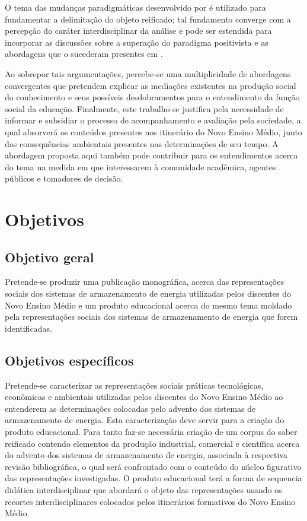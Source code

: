 \documentclass[
   article,       %
   12pt,          %
   oneside,       %
   a4paper,       %
   english,       %
   brazil,           %
   sumario=tradicional
   ]{abntex2}
\begin{document}
O tema das mudanças paradigmáticas desenvolvido por \cite{Kuhn2012-oa} é utilizado para fundamentar a delimitação do objeto reificado; tal fundamento converge com a percepção do caráter interdisciplinar da análise e pode ser estendida para incorporar as discussões sobre a superação do paradigma positivista e as abordagens que o sucederam presentes em \cite{Lincoln1985-ua}.

Ao sobrepor tais argumentações, percebe-se uma multiplicidade de abordagens convergentes que pretendem explicar as mediações existentes na produção social do conhecimento e seus possíveis desdobramentos para o entendimento da função social da educação.
Finalmente, este trabalho se justifica pela necessidade de informar e subsidiar o processo de acompanhamento e avaliação pela sociedade, a qual absorverá os conteúdos presentes nos itinerário do Novo Ensino Médio, junto das consequências ambientais presentes nas determinações de seu tempo. A abordagem proposta aqui também pode contribuir para os entendimentos acerca do tema na medida em que interessarem à comunidade acadêmica, agentes públicos e tomadores de decisão.


\section{Objetivos}
\subsection{Objetivo geral}

Pretende-se produzir uma publicação monográfica, acerca das representações sociais dos sistemas de armazenamento de energia utilizadas pelos discentes do Novo Ensino Médio e um produto educacional acerca do mesmo tema moldado pela representações sociais dos sistemas de armazenamento de energia que forem identificadas.

\subsection{Objetivos específicos}

Pretende-se caracterizar as  representações sociais práticas tecnológicas, econômicas e ambientais utilizadas pelos discentes do Novo Ensino Médio ao entenderem as determinações colocadas pelo advento dos sistemas de armazenamento de energia. Esta caracterização deve servir para a criação do produto educacional.
Para tanto faz-se necessária criação de um corpus do saber reificado contendo elementos da produção industrial, comercial e científica acerca do advento dos sistemas de armazenamento de energia, associada à respectiva revisão bibliográfica, o qual será confrontado com o conteúdo do núcleo figurativo das representações investigadas. O produto educacional terá a forma de sequencia didática interdisciplinar que abordará o objeto das representações usando os recortes interdisciplinares colocados pelos itinerários formativos do Novo Ensino Médio.
\end{document}
